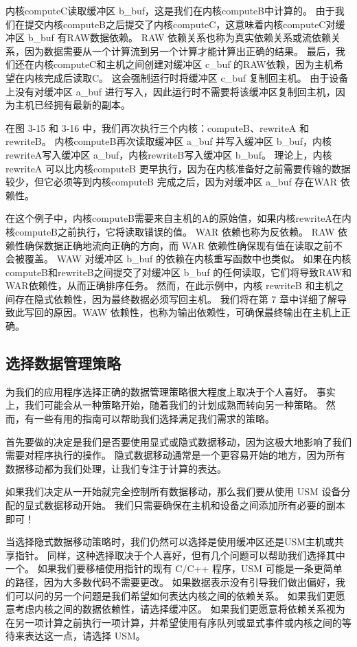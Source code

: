 内核computeC读取缓冲区 b\_buf，这是我们在内核computeB中计算的。 由于我们在提交内核computeB之后提交了内核computeC，这意味着内核computeC对缓冲区 b\_buf 有RAW数据依赖。 RAW 依赖关系也称为真实依赖关系或流依赖关系，因为数据需要从一个计算流到另一个计算才能计算出正确的结果。 最后，我们还在内核computeC和主机之间创建对缓冲区 c\_buf 的RAW依赖，因为主机希望在内核完成后读取C。 这会强制运行时将缓冲区 c\_buf 复制回主机。 由于设备上没有对缓冲区 a\_buf 进行写入，因此运行时不需要将该缓冲区复制回主机，因为主机已经拥有最新的副本。

在图 3-15 和 3-16 中，我们再次执行三个内核：computeB、rewriteA 和 rewriteB。 内核computeB再次读取缓冲区 a\_buf 并写入缓冲区 b\_buf，内核rewriteA写入缓冲区 a\_buf，内核rewriteB写入缓冲区 b\_buf。 理论上，内核 rewriteA 可以比内核computeB 更早执行，因为在内核准备好之前需要传输的数据较少，但它必须等到内核computeB 完成之后，因为对缓冲区 a\_buf 存在WAR 依赖性。

在这个例子中，内核computeB需要来自主机的A的原始值，如果内核rewriteA在内核computeB之前执行，它将读取错误的值。 WAR 依赖也称为反依赖。 RAW 依赖性确保数据正确地流向正确的方向，而 WAR 依赖性确保现有值在读取之前不会被覆盖。 WAW 对缓冲区 b\_buf 的依赖在内核重写函数中也类似。 如果在内核computeB和rewriteB之间提交了对缓冲区 b\_buf 的任何读取，它们将导致RAW和WAR依赖性，从而正确排序任务。 然而，在此示例中，内核 rewriteB 和主机之间存在隐式依赖性，因为最终数据必须写回主机。 我们将在第 7 章中详细了解导致此写回的原因。WAW 依赖性，也称为输出依赖性，可确保最终输出在主机上正确。

\subsection{选择数据管理策略}
为我们的应用程序选择正确的数据管理策略很大程度上取决于个人喜好。 事实上，我们可能会从一种策略开始，随着我们的计划成熟而转向另一种策略。 然而，有一些有用的指南可以帮助我们选择满足我们需求的策略。

首先要做的决定是我们是否要使用显式或隐式数据移动，因为这极大地影响了我们需要对程序执行的操作。 隐式数据移动通常是一个更容易开始的地方，因为所有数据移动都为我们处理，让我们专注于计算的表达。

如果我们决定从一开始就完全控制所有数据移动，那么我们要从使用 USM 设备分配的显式数据移动开始。 我们只需要确保在主机和设备之间添加所有必要的副本即可！

当选择隐式数据移动策略时，我们仍然可以选择是使用缓冲区还是USM主机或共享指针。 同样，这种选择取决于个人喜好，但有几个问题可以帮助我们选择其中一个。 如果我们要移植使用指针的现有 C/C++ 程序，USM 可能是一条更简单的路径，因为大多数代码不需要更改。 如果数据表示没有引导我们做出偏好，我们可以问的另一个问题是我们希望如何表达内核之间的依赖关系。 如果我们更愿意考虑内核之间的数据依赖性，请选择缓冲区。 如果我们更愿意将依赖关系视为在另一项计算之前执行一项计算，并希望使用有序队列或显式事件或内核之间的等待来表达这一点，请选择 USM。

